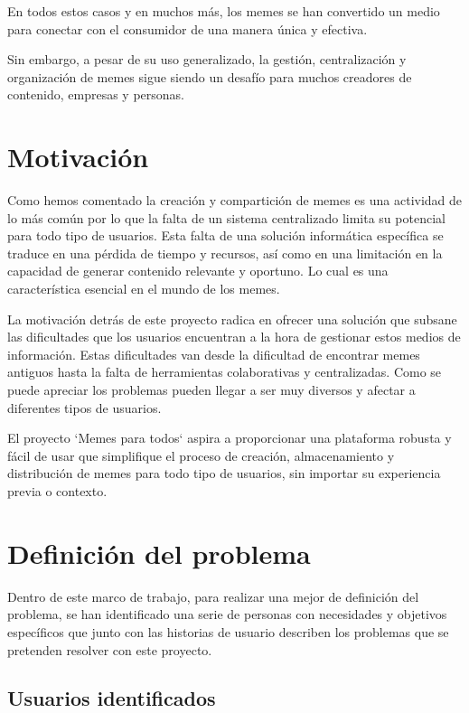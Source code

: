 En todos estos casos y en muchos más, los memes se han convertido un medio para conectar con el consumidor de una manera única y efectiva.

Sin embargo, a pesar de su uso generalizado, la gestión, centralización y organización de memes sigue siendo un desafío para muchos creadores de contenido, empresas y personas.

\section{Motivación}

Como hemos comentado la creación y compartición de memes es una actividad de lo más común por lo que la falta de un sistema centralizado limita su potencial para todo tipo de usuarios. Esta falta de una solución informática específica se traduce en una pérdida de tiempo y recursos, así como en una limitación en la capacidad de generar contenido relevante y oportuno. Lo cual es una característica esencial en el mundo de los memes.

La motivación detrás de este proyecto radica en ofrecer una solución que subsane las dificultades que los usuarios encuentran a la hora de gestionar estos medios de información. Estas dificultades van desde la dificultad de encontrar memes antiguos hasta la falta de herramientas colaborativas y centralizadas. Como se puede apreciar los problemas pueden llegar a ser muy diversos y afectar a diferentes tipos de usuarios.

El proyecto `Memes para todos` aspira a proporcionar una plataforma robusta y fácil de usar que simplifique el proceso de creación, almacenamiento y distribución de memes para todo tipo de usuarios, sin importar su experiencia previa o contexto.

\section{Definición del problema}

Dentro de este marco de trabajo, para realizar una mejor de definición del problema, se han identificado una serie de personas con necesidades y objetivos específicos que junto con las historias de usuario describen los problemas que se pretenden resolver con este proyecto.

\subsection{Usuarios identificados}


